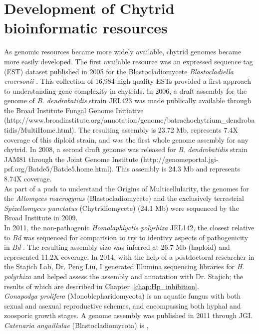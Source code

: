 \section{Development of Chytrid bioinformatic resources}
As genomic resources became more widely available, chytrid genomes became more easily developed. The first available resource was an expressed sequence tag (EST) dataset published in 2005 for the Blastocladiomycete \textit{Blastocladiella emersonii} \cite{Ribichich2005}. This collection of 16,984 high-quality ESTs provided a first approach to understanding gene complexity in chytrids. In 2006, a draft assembly for the genome of \textit{B. dendrobatidis} strain JEL423 was made publically available through the Broad Institute Fungal Genome Initiative (http://www.broadinstitute.org/annotation/genome/batrachochytrium\_dendrobatidis/MultiHome.html). The resulting assembly is 23.72 Mb, represents 7.4X coverage of this diploid strain, and was the first whole genome assembly for any chytrid. In 2008, a second draft genome was released for \textit{B. dendrobatidis} strain JAM81 through the Joint Genome Institute (http://genomeportal.jgi-psf.org/Batde5/Batde5.home.html). This assembly is 24.3 Mb and represents 8.74X coverage. \\
\indent As part of a push to understand the Origins of Multicellularity, the genomes for the \textit{Allomyces macrogynus} (Blastocladiomycete) and the exclusively terrestrial \textit{Spizellomyces punctatus} (Chytridiomycete) (24.1 Mb) were sequenced by the Broad Institute in 2009. \\
\indent In 2011, the non-pathogenic \textit{Homolaphlyctis polyrhiza} JEL142, the closest relative to \textit{Bd} was sequenced for comparision to try to identivy aspects of pathogenicity in \textit{Bd} \cite{Joneson2011}. The resulting assembly size was inferred at 26.7 Mb (haploid) and represented 11.2X coverage. In 2014, with the help of a postdoctoral researcher in the Stajich Lab, Dr. Peng Liu, I generated Illumina sequencing libraries for \textit{H. polyrhiza} and helped assess the assembly and annotation with Dr. Stajich; the results of which are described in Chapter~\ref{chap:Hp_inhibition}.\\
\indent \textit{Gonapodya prolifera} (Monoblepharidomycota) is an aquatic fungus with both sexual and asexual reproductive schemes, and encompassing both hyphal and zoosporic growth stages. A genome assembly was published in 2011 through JGI. \textit{Catenaria anguillulae} (Blastocladiomycota) is , \\

